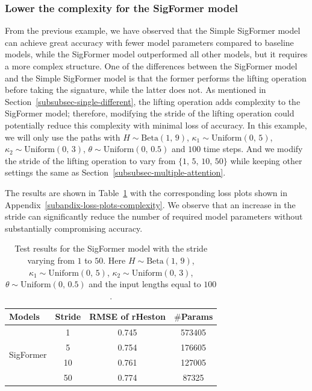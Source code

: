 \documentclass[]{article}
\renewcommand{\(}{\left(}
\renewcommand{\)}{\right)}
\begin{document}
	\subsubsection{Lower the complexity for the SigFormer model}
	\label{subsubsec-multiple-complexity}
	From the previous example, we have observed that the Simple SigFormer model can achieve great accuracy with fewer model parameters compared to baseline models, while the SigFormer model outperformed all other models, but it requires a more complex structure. One of the differences between the SigFormer model and the Simple SigFormer model is that the former performs the lifting operation before taking the signature, while the latter does not.
	As mentioned in Section~\ref{subsubsec-single-different}, the lifting operation adds complexity to the SigFormer model; therefore, modifying the stride of the lifting operation could potentially reduce this complexity with minimal loss of accuracy. In this example, we will only use the paths with $H\sim\text{Beta}(1,\,9)$, $\kappa_1\sim\text{Uniform}(0,\,5)$, $\kappa_2\sim\text{Uniform}(0,\,3)$, $\theta\sim\text{Uniform}(0,\,0.5)$ and $100$ time steps. And we modify the stride of the lifting operation to vary from $\{1,\,5,\,10,\,50\}$ while keeping other settings the same as Section~\ref{subsubsec-multiple-attention}.
	
	The results are shown in Table~\ref{tab-multiple-complexity} with the corresponding loss plots shown in Appendix~\ref{subapdix-loss-plots-complexity}. We observe that an increase in the stride can significantly reduce the number of required model parameters without substantially compromising accuracy.
	\begin{table}[H]
		\caption{Test results for the SigFormer model with the stride varying from $1$ to $50$. Here $H\sim\text{Beta}(1,\,9)$, $\kappa_1\sim\text{Uniform}(0,\,5)$, $\kappa_2\sim\text{Uniform}(0,\,3)$, $\theta\sim\text{Uniform}(0,\,0.5)$ and the input lengths equal to $100$. }
		\label{tab-multiple-complexity}
		\smallskip
		\centering
		\renewcommand\arraystretch{1.5}
		\begin{tabular}{l c c c}
			\toprule
			Models&Stride&RMSE of rHeston&$\#$Params\\
			\hline
			\multirow{4}{*}{SigFormer}&1&0.745&573405\\
			&5&0.754&176605\\
			&10&0.761&127005\\
			&50&0.774&87325\\
			\bottomrule
		\end{tabular}
	\end{table}
	
\end{document}
